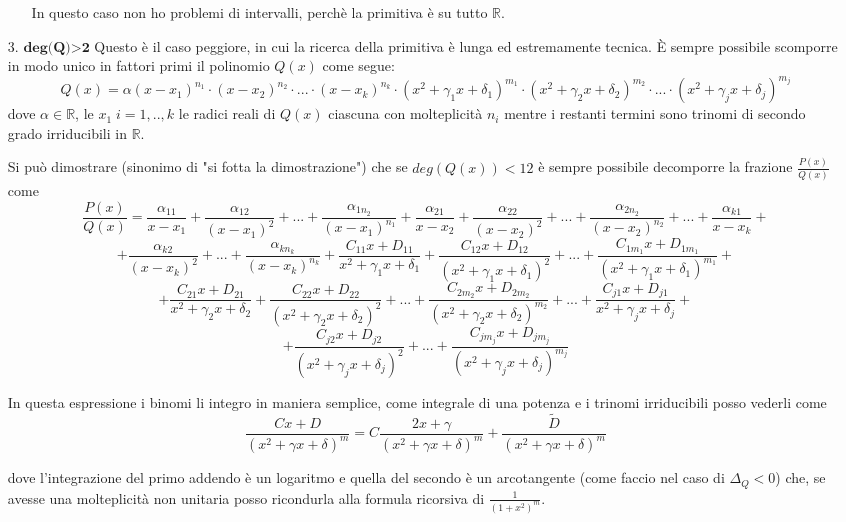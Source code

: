 \documentclass{article}
\theoremstyle{definition}
\theoremstyle{definition}
\theoremstyle{definition}
\theoremstyle{definition}
\theoremstyle{definition}
\theoremstyle{definition}
\begin{document}
\begin{itemize}
\begin{itemize}
                    In questo caso non ho problemi di intervalli, perchè la primitiva è su tutto $\mathbb{R}$.
                \end{itemize}
    \item [3.]  $\textbf{deg(Q)>2}$ Questo è il caso peggiore, in cui la ricerca della primitiva è lunga ed estremamente tecnica. È sempre possibile scomporre in modo  unico in fattori primi il polinomio $Q(x)$ come segue:
    \[Q(x)=\alpha(x-x_1)^{n_1}\cdot(x-x_2)^{n_2}\cdot...\cdot(x-x_k)^{n_k}\cdot(x^2+\gamma_1x+\delta_1)^{m_1}\cdot(x^2+\gamma_2x+\delta_2)^{m_2}\cdot...\cdot(x^2+\gamma_jx+\delta_j)^{m_j}\]
    dove $\alpha\in\mathbb{R}$, le $x_1 \; i=1,..,k$ le radici reali di $Q(x)$ ciascuna con molteplicità $n_i$ mentre i restanti termini sono trinomi di secondo grado irriducibili in $\mathbb{R}$.

    Si può dimostrare (sinonimo di "si fotta la dimostrazione") che se $deg(Q(x))<12$ è sempre possibile decomporre la frazione $\frac{P(x)}{Q(x)}$ come
    \[\frac{P(x)}{Q(x)}=\frac{\alpha_{11}}{x-x_1}+\frac{\alpha_{12}}{(x-x_1)^2}+...+\frac{\alpha_{1n_2}}{(x-x_1)^{n_1}}+\frac{\alpha_{21}}{x-x_2}+\frac{\alpha_{22}}{(x-x_2)^2}+...+\frac{\alpha_{2n_2}}{(x-x_2)^{n_2}}+...+\frac{\alpha_{k1}}{x-x_k}+\]
    \[+\frac{\alpha_{k2}}{(x-x_k)^2}+...+\frac{\alpha_{kn_k}}{(x-x_k)^{n_k}}+\frac{C_{11}x+D_{11}}{x^2+\gamma_1x+\delta_1}+\frac{C_{12}x+D_{12}}{(x^2+\gamma_1x+\delta_1)^2}+...+\frac{C_{1m_1}x+D_{1m_1}}{(x^2+\gamma_1x+\delta_1)^{m_1}}+\]
    \[+\frac{C_{21}x+D_{21}}{x^2+\gamma_2x+\delta_2}+\frac{C_{22}x+D_{22}}{(x^2+\gamma_2x+\delta_2)^2}+...+\frac{C_{2m_2}x+D_{2m_2}}{(x^2+\gamma_2x+\delta_2)^{m_2}}+...+\frac{C_{j1}x+D_{j1}}{x^2+\gamma_jx+\delta_j}+\]
    \[+\frac{C_{j2}x+D_{j2}}{(x^2+\gamma_jx+\delta_j)^2}+...+\frac{C_{jm_j}x+D_{jm_j}}{(x^2+\gamma_jx+\delta_j)^{m_j}}\]

    In questa espressione i binomi li integro in maniera semplice, come integrale di una potenza e i trinomi irriducibili posso vederli come
    \[\frac{Cx+D}{(x^2+\gamma x+\delta)^m}=C\frac{2x+\gamma}{(x^2+\gamma x+\delta)^m}+\frac{\tilde{D}}{(x^2+\gamma x+\delta)^m}\]

    dove l'integrazione del primo addendo è un logaritmo e quella del secondo è un arcotangente (come faccio nel caso di $\Delta_Q<0$) che, se avesse una molteplicità non unitaria posso ricondurla alla formula ricorsiva di $\displaystyle{\frac{1}{(1+x^2)^m}}$.

\end{itemize}
\end{document}
